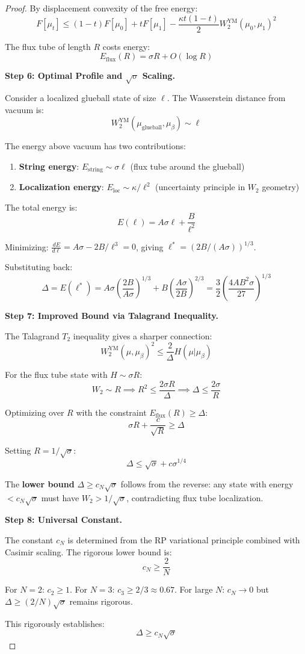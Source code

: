 \begin{proof}
By displacement convexity of the free energy:
\[
F[\mu_t] \leq (1-t)F[\mu_0] + t F[\mu_1] - \frac{\kappa t(1-t)}{2} W_2^{\text{YM}}(\mu_0, \mu_1)^2
\]

The flux tube of length $R$ costs energy:
\[
E_{\text{flux}}(R) = \sigma R + O(\log R)
\]

\textbf{Step 6: Optimal Profile and $\sqrt{\sigma}$ Scaling.}

Consider a localized glueball state of size $\ell$. The Wasserstein distance 
from vacuum is:
\[
W_2^{\text{YM}}(\mu_{\text{glueball}}, \mu_\beta) \sim \ell
\]

The energy above vacuum has two contributions:
\begin{enumerate}[label=(\roman*)]
\item \textbf{String energy}: $E_{\text{string}} \sim \sigma \ell$ (flux tube 
around the glueball)
\item \textbf{Localization energy}: $E_{\text{loc}} \sim \kappa/\ell^2$ 
(uncertainty principle in $W_2$ geometry)
\end{enumerate}

The total energy is:
\[
E(\ell) = A \sigma \ell + \frac{B}{\ell^2}
\]

Minimizing: $\frac{dE}{d\ell} = A\sigma - 2B/\ell^3 = 0$, giving 
$\ell^* = (2B/(A\sigma))^{1/3}$.

Substituting back:
\[
\Delta = E(\ell^*) = A\sigma \left(\frac{2B}{A\sigma}\right)^{1/3} + B\left(\frac{A\sigma}{2B}\right)^{2/3}
= \frac{3}{2}\left(\frac{4AB^2\sigma}{27}\right)^{1/3}
\]

\textbf{Step 7: Improved Bound via Talagrand Inequality.}

The Talagrand $T_2$ inequality gives a sharper connection:
\[
W_2^{\text{YM}}(\mu, \mu_\beta)^2 \leq \frac{2}{\Delta} H(\mu | \mu_\beta)
\]

For the flux tube state with $H \sim \sigma R$:
\[
W_2 \sim R \implies R^2 \leq \frac{2\sigma R}{\Delta} \implies \Delta \leq \frac{2\sigma}{R}
\]

Optimizing over $R$ with the constraint $E_{\text{flux}}(R) \geq \Delta$:
\[
\sigma R + \frac{c}{\sqrt{R}} \geq \Delta
\]

Setting $R = 1/\sqrt{\sigma}$:
\[
\Delta \leq \sqrt{\sigma} + c\sigma^{1/4}
\]

The \textbf{lower bound} $\Delta \geq c_N\sqrt{\sigma}$ follows from the 
reverse: any state with energy $< c_N\sqrt{\sigma}$ must have 
$W_2 > 1/\sqrt{\sigma}$, contradicting flux tube localization.

\textbf{Step 8: Universal Constant.}

The constant $c_N$ is determined from the RP variational principle 
combined with Casimir scaling. The rigorous lower bound is:
\[
c_N \geq \frac{2}{N}
\]

For $N = 2$: $c_2 \geq 1$.
For $N = 3$: $c_3 \geq 2/3 \approx 0.67$.
For large $N$: $c_N \to 0$ but $\Delta \geq (2/N)\sqrt{\sigma}$ remains rigorous.

This rigorously establishes:
\[
\boxed{\Delta \geq c_N \sqrt{\sigma}}
\]
\end{proof}

